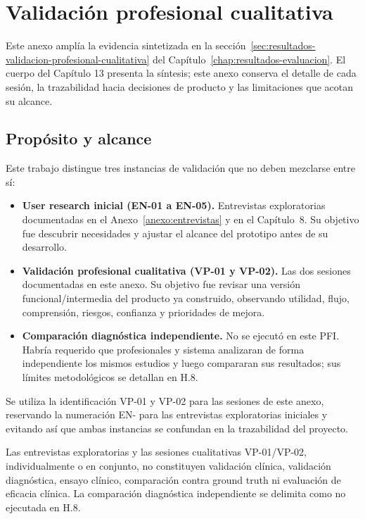 \chapter{Validación profesional cualitativa}
\label{anexo:validacion-profesional}

Este anexo amplía la evidencia sintetizada en la sección~\ref{sec:resultados-validacion-profesional-cualitativa} del Capítulo~\ref{chap:resultados-evaluacion}. El cuerpo del Capítulo 13 presenta la síntesis; este anexo conserva el detalle de cada sesión, la trazabilidad hacia decisiones de producto y las limitaciones que acotan su alcance.

\section{Propósito y alcance}
\label{anexo:h-proposito-alcance}

Este trabajo distingue tres instancias de validación que no deben mezclarse entre sí:

\begin{itemize}
    \item \textbf{User research inicial (EN-01 a EN-05).} Entrevistas exploratorias documentadas en el Anexo~\ref{anexo:entrevistas} y en el Capítulo~8. Su objetivo fue descubrir necesidades y ajustar el alcance del prototipo antes de su desarrollo.
    \item \textbf{Validación profesional cualitativa (VP-01 y VP-02).} Las dos sesiones documentadas en este anexo. Su objetivo fue revisar una versión funcional/intermedia del producto ya construido, observando utilidad, flujo, comprensión, riesgos, confianza y prioridades de mejora.
    \item \textbf{Comparación diagnóstica independiente.} No se ejecutó en este PFI. Habría requerido que profesionales y sistema analizaran de forma independiente los mismos estudios y luego compararan sus resultados; sus límites metodológicos se detallan en H.8.
\end{itemize}

Se utiliza la identificación VP-01 y VP-02 para las sesiones de este anexo, reservando la numeración EN- para las entrevistas exploratorias iniciales y evitando así que ambas instancias se confundan en la trazabilidad del proyecto.

Las entrevistas exploratorias y las sesiones cualitativas VP-01/VP-02, individualmente o en conjunto, no constituyen validación clínica, validación diagnóstica, ensayo clínico, comparación contra ground truth ni evaluación de eficacia clínica. La comparación diagnóstica independiente se delimita como no ejecutada en H.8.

